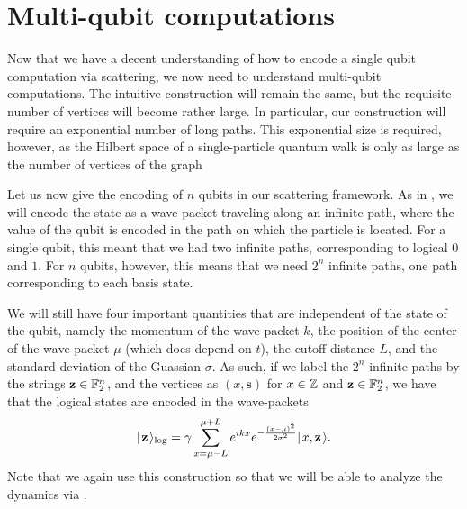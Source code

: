 \documentclass[../thesis-main/thesis-main]{subfiles}
\begin{document}




\section{Multi-qubit computations}
\label{sec:multi_qubit_computations}

Now that we have a decent understanding of how to encode a single qubit computation via scattering, we now need to understand multi-qubit computations.  The intuitive construction will remain the same, but the requisite number of vertices will become rather large.  In particular, our construction will require an exponential number of long paths.  This exponential size is required, however, as the Hilbert space of a single-particle quantum walk is only as large as the number of vertices of the graph

Let us now give the encoding of $n$ qubits in our scattering framework.  As in , we will encode the state as a wave-packet traveling along an infinite path, where the value of the qubit is encoded in the path on which the particle is located.  For a single qubit, this meant that we had two infinite paths, corresponding to logical $0$ and $1$.  For $n$ qubits, however, this means that we need $2^n$ infinite paths, one path corresponding to each basis state.

We will still have four important quantities that are independent of the state of the qubit, namely the momentum of the wave-packet $k$, the position of the center of the wave-packet $\mu$ (which does depend on $t$), the cutoff distance $L$, and the standard deviation of the Guassian $\sigma$.  As such, if we label the $2^n$ infinite paths by the strings $\mathbf{z}\in \mathbb{F}_2^n$, and the vertices as $(x,\mathbf{s})$ for $x\in \mathbb{Z}$ and $\mathbf{z}\in \mathbb{F}_2^n$, we have that the logical states are encoded in the wave-packets
\begin{align}
  |\mspace{2mu} \mathbf{z} \mspace{2mu} \rangle_{\text{log}} = \gamma \sum_{x = \mu - L}^{\mu + L} e^{ i k x} e^{ - \frac{(x-\mu)^2}{2\sigma^2}} |\mspace{2mu} x,\mathbf{z} \mspace{2mu} \rangle \label{eq:multi_qubit_encoding}.
\end{align}
Note that we again use this construction so that we will be able to analyze the dynamics via .

\end{document}
